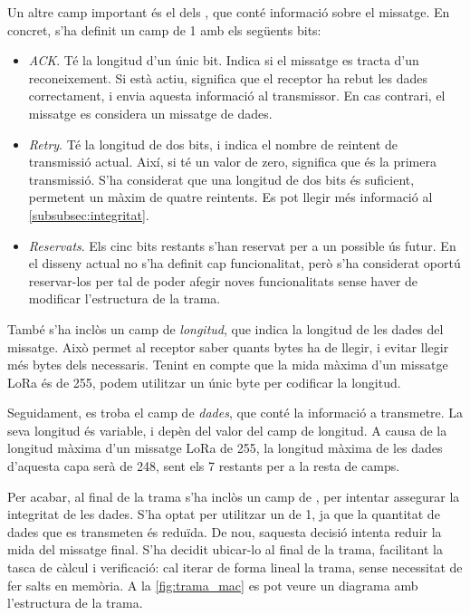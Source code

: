 \documentclass{tfgitic}[2024/07/01]
\begin{document}
Un altre camp important és el dels , que conté informació sobre el missatge. En concret, s'ha definit un camp de \SI{1}{\byte} amb els següents bits:
\begin{itemize}
    \item \emph{ACK}. Té la longitud d'un únic bit. Indica si el missatge es tracta d'un reconeixement. Si està actiu, significa que el receptor ha rebut les dades correctament, i envia aquesta informació al transmissor. En cas contrari, el missatge es considera un missatge de dades.
    \item \emph{Retry}. Té la longitud de dos bits, i indica el nombre de reintent de transmissió actual. Així, si té un valor de zero, significa que és la primera transmissió. S'ha considerat que una longitud de dos bits és suficient, permetent un màxim de quatre reintents. Es pot llegir més informació al \autoref{subsubsec:integritat}.
    \item \emph{Reservats}. Els cinc bits restants s'han reservat per a un possible ús futur. En el disseny actual no s'ha definit cap funcionalitat, però s'ha considerat oportú reservar-los per tal de poder afegir noves funcionalitats sense haver de modificar l'estructura de la trama.
\end{itemize}

També s'ha inclòs un camp de \emph{longitud}, que indica la longitud de les dades del missatge. Això permet al receptor saber quants bytes ha de llegir, i evitar llegir més bytes dels necessaris. Tenint en compte que la mida màxima d'un missatge LoRa és de \SI{255}{\byte}, podem utilitzar un únic byte per codificar la longitud.

Seguidament, es troba el camp de \emph{dades}, que conté la informació a transmetre. La seva longitud és variable, i depèn del valor del camp de longitud. A causa de la longitud màxima d'un missatge LoRa de \SI{255}{\byte}, la longitud màxima de les dades d'aquesta capa serà de \SI{248}{\byte}, sent els \SI{7}{\byte} restants per a la resta de camps. 

Per acabar, al final de la trama s'ha inclòs un camp de , per intentar assegurar la integritat de les dades. S'ha optat per utilitzar un  de \SI{1}{\byte}, ja que la quantitat de dades que es transmeten és reduïda. De nou, saquesta decisió intenta reduir la mida del missatge final. S'ha decidit ubicar-lo al final de la trama, facilitant la tasca de càlcul i verificació: cal iterar de forma lineal la trama, sense necessitat de fer salts en memòria. A la \autoref{fig:trama_mac} es pot veure un diagrama amb l'estructura de la trama.
\end{document}
